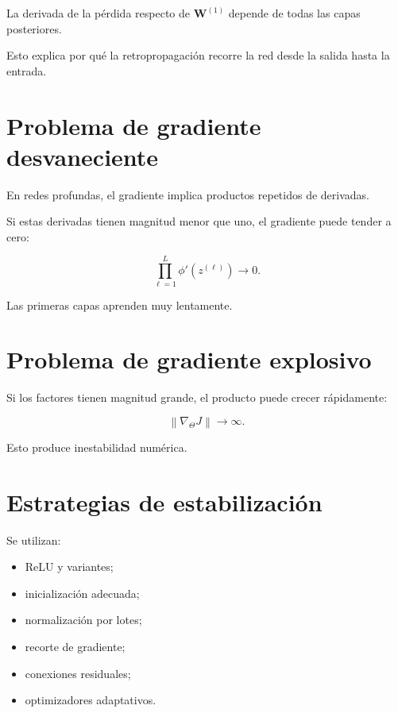 \documentclass[
  spanish,
  10.5pt,
  letterpaper,
  DIV=11,
  numbers=noendperiod,
  oneside,
  open=any]{scrreprt}
\providecommand{\tightlist}{%
  \setlength{\itemsep}{0pt}\setlength{\parskip}{0pt}}
\theoremstyle{definition}
\theoremstyle{definition}
\theoremstyle{plain}
\theoremstyle{remark}
\begin{document}

La derivada de la pérdida respecto de \(\mathbf{W}^{(1)}\) depende de
todas las capas posteriores.

Esto explica por qué la retropropagación recorre la red desde la salida
hasta la entrada.

\section*{Problema de gradiente
desvaneciente}\label{problema-de-gradiente-desvaneciente}


En redes profundas, el gradiente implica productos repetidos de
derivadas.

Si estas derivadas tienen magnitud menor que uno, el gradiente puede
tender a cero:

\[
\prod_{\ell=1}^{L}
\phi'
\left(
z^{(\ell)}
\right)
\to 0.
\]

Las primeras capas aprenden muy lentamente.

\section*{Problema de gradiente
explosivo}\label{problema-de-gradiente-explosivo}


Si los factores tienen magnitud grande, el producto puede crecer
rápidamente:

\[
\left\|
\nabla_{\Theta}J
\right\|
\to\infty.
\]

Esto produce inestabilidad numérica.

\section*{Estrategias de
estabilización}\label{estrategias-de-estabilizaciuxf3n}


Se utilizan:

\begin{itemize}
\tightlist
\item
  ReLU y variantes;
\item
  inicialización adecuada;
\item
  normalización por lotes;
\item
  recorte de gradiente;
\item
  conexiones residuales;
\item
  optimizadores adaptativos.
\end{itemize}
\end{document}
